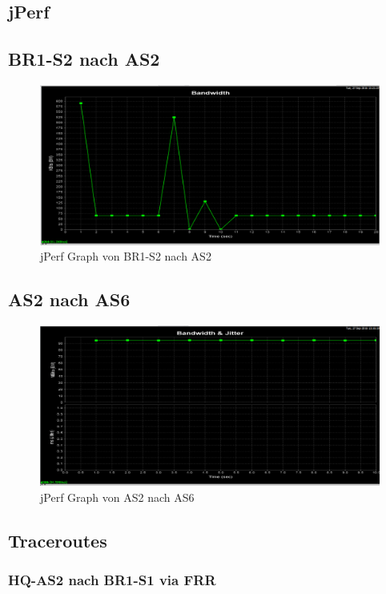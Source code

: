 \subsection{jPerf}

\subsection{BR1-S2 nach AS2}
\begin{figure}[h]
	\centering
	\includegraphics[width=0.7\linewidth]{appendix/measurements/jperf/br1-s2-to-as2}
	\caption{jPerf Graph von BR1-S2 nach AS2}
	\label{fig:as2-to-as6}
\end{figure}

\subsection{AS2 nach AS6}
\begin{figure}[h]
\centering
\includegraphics[width=0.7\linewidth]{appendix/measurements/jperf/as2-to-as6}
\caption{jPerf Graph von AS2 nach AS6}
\label{fig:as2-to-as6}
\end{figure}



\subsection{Traceroutes}
\subsubsection{HQ-AS2 nach BR1-S1 via FRR}


